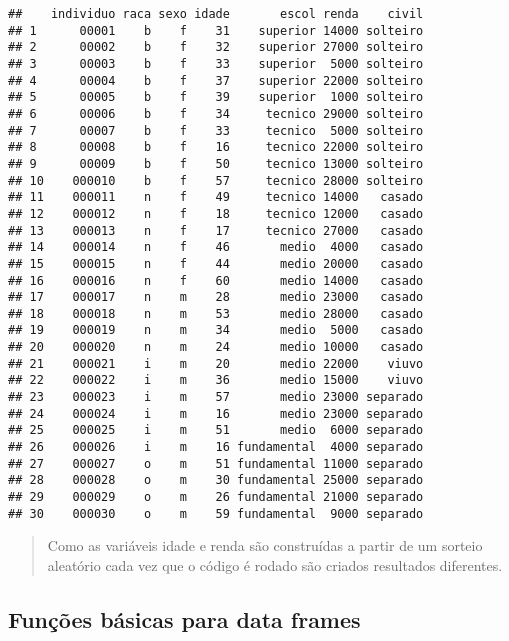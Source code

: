 \documentclass[]{book}
\theoremstyle{definition}
\theoremstyle{definition}
\theoremstyle{definition}
\theoremstyle{remark}
\begin{document}
\begin{verbatim}
##    individuo raca sexo idade       escol renda    civil
## 1      00001    b    f    31    superior 14000 solteiro
## 2      00002    b    f    32    superior 27000 solteiro
## 3      00003    b    f    33    superior  5000 solteiro
## 4      00004    b    f    37    superior 22000 solteiro
## 5      00005    b    f    39    superior  1000 solteiro
## 6      00006    b    f    34     tecnico 29000 solteiro
## 7      00007    b    f    33     tecnico  5000 solteiro
## 8      00008    b    f    16     tecnico 22000 solteiro
## 9      00009    b    f    50     tecnico 13000 solteiro
## 10    000010    b    f    57     tecnico 28000 solteiro
## 11    000011    n    f    49     tecnico 14000   casado
## 12    000012    n    f    18     tecnico 12000   casado
## 13    000013    n    f    17     tecnico 27000   casado
## 14    000014    n    f    46       medio  4000   casado
## 15    000015    n    f    44       medio 20000   casado
## 16    000016    n    f    60       medio 14000   casado
## 17    000017    n    m    28       medio 23000   casado
## 18    000018    n    m    53       medio 28000   casado
## 19    000019    n    m    34       medio  5000   casado
## 20    000020    n    m    24       medio 10000   casado
## 21    000021    i    m    20       medio 22000    viuvo
## 22    000022    i    m    36       medio 15000    viuvo
## 23    000023    i    m    57       medio 23000 separado
## 24    000024    i    m    16       medio 23000 separado
## 25    000025    i    m    51       medio  6000 separado
## 26    000026    i    m    16 fundamental  4000 separado
## 27    000027    o    m    51 fundamental 11000 separado
## 28    000028    o    m    30 fundamental 25000 separado
## 29    000029    o    m    26 fundamental 21000 separado
## 30    000030    o    m    59 fundamental  9000 separado
\end{verbatim}

\begin{quote}
Como as variáveis idade e renda são construídas a partir de um sorteio aleatório cada vez que o código é rodado são criados resultados diferentes.
\end{quote}

\hypertarget{funuxe7uxf5es-buxe1sicas-para-data-frames}{%
\subsection{Funções básicas para data frames}\label{funuxe7uxf5es-buxe1sicas-para-data-frames}}
\end{document}
